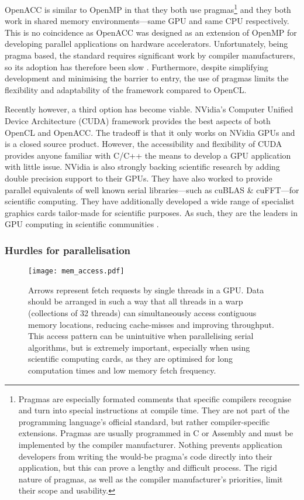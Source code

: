 OpenACC is similar to OpenMP in that they both use pragmas\footnote{Pragmas are especially formated comments that specific compilers recognise and turn into special instructions at compile time. They are not part of the programming language's official standard, but rather compiler-specific extensions. Pragmas are usually programmed in C or Assembly and must be implemented by the compiler manufacturer. Nothing prevents application developers from writing the would-be pragma's code directly into their application, but this can prove a lengthy and difficult process. The rigid nature of pragmas, as well as the compiler manufacturer's priorities, limit their scope and usability.} and they both work in shared memory environments---same GPU and same CPU respectively. This is no coincidence as OpenACC was designed as an extension of OpenMP for developing parallel applications on hardware accelerators. Unfortunately, being pragma based, the standard requires significant work by compiler manufacturers, so its adoption has therefore been slow \cite{openacc}. Furthermore, despite simplifying development and minimising the barrier to entry, the use of pragmas limits the flexibility and adaptability of the framework compared to OpenCL.

Recently however, a third option has become viable. NVidia's Computer Unified Device Architecture (CUDA) framework provides the best aspects of both OpenCL and OpenACC. The tradeoff is that it only works on NVidia GPUs and is a closed source product. However, the accessibility and flexibility of CUDA provides anyone familiar with C/C++ the means to develop a GPU application with little issue. NVidia is also strongly backing scientific research by adding double precision support to their GPUs. They have also worked to provide parallel equivalents of well known serial libraries---such as cuBLAS \& cuFFT---for scientific computing. They have additionally developed a wide range of specialist graphics cards tailor-made for scientific purposes. As such, they are the leaders in GPU computing in scientific communities \cite{nvidia}.

\subsubsection{Hurdles for parallelisation}
\label{sc:hurdpara}

\begin{figure}
    \centering
    \texttt{[image: mem\_access.pdf]}
    \caption[Memory access pattern example.]{Arrows represent fetch requests by single threads in a GPU. Data should be arranged in such a way that all threads in a warp (collections of 32 threads) can simultaneously access contiguous memory locations, reducing cache-misses and improving throughput. This access pattern can be unintuitive when parallelising serial algorithms, but is extremely important, especially when using scientific computing cards, as they are optimised for long computation times and low memory fetch frequency.}
    \label{f:mem_accessIntro}
\end{figure}

